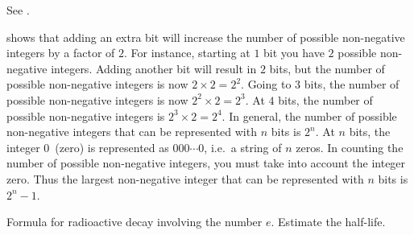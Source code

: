 \documentclass[a4paper,oneside,12pt]{article}
\begin{document}
\begin{problem}
{\begin{solution}
See .

\begin{table}[!htbp]
\centering

\caption{%
  The number of non-negative integers that can be represented with a
  given number of bits.  Going from left to right, the third column
  contains the consecutive growth factors.  Starting from the row with
  two bits downwards, the growth factor for the row is defined as the
  number of non-negative integers that can be represented with $n$
  bits divided by the number of non-negative integers that can be
  represented with $n - 1$ bits.  The right-most column contains the
  largest non-negative integer that can be represented with $n$ bits.
}
\label{tab:binary_how_many_integers}
\end{table}

 shows that adding an extra bit
will increase the number of possible non-negative integers by a factor
of $2$.  For instance, starting at $1$ bit you have $2$ possible
non-negative integers.  Adding another bit will result in $2$ bits,
but the number of possible non-negative integers is now
$2 \times 2 = 2^2$.  Going to $3$ bits, the number of possible
non-negative integers is now $2^2 \times 2 = 2^3$.  At $4$ bits, the
number of possible non-negative integers is $2^3 \times 2 = 2^4$.  In
general, the number of possible non-negative integers that can be
represented with $n$ bits is $2^n$.  At $n$ bits, the integer
$0$~(zero) is represented as $000 \cdots 0$, i.e.~a string of $n$
zeros.  In counting the number of possible non-negative integers, you
must take into account the integer zero.  Thus the largest
non-negative integer that can be represented with $n$ bits is
$2^n - 1$.
\end{solution}
}{}

\item Formula for radioactive decay involving the number $e$.
  Estimate the half-life.

\begin{table}[!htbp]
\centering

\caption{%
  The vapour pressure of water as temperature increases.  Temperature
  is measured in degrees Celsius~($\degreec{}$) and the vapour
  pressure of water is measured in millimetre of mercury~(mm Hg).  The
  given vapour pressures cover only the case where water is in contact
  with its own vapour.  Data are taken from the following book:
  J.~G.~Speight~(editor). \emph{Lange's Handbook of Chemistry}. 16-th
  edition, McGraw-Hill, 2005, pp.1.224--1.225.
}
\label{tab:water_vapour_pressure}
\end{table}


\end{problem}
\end{document}
